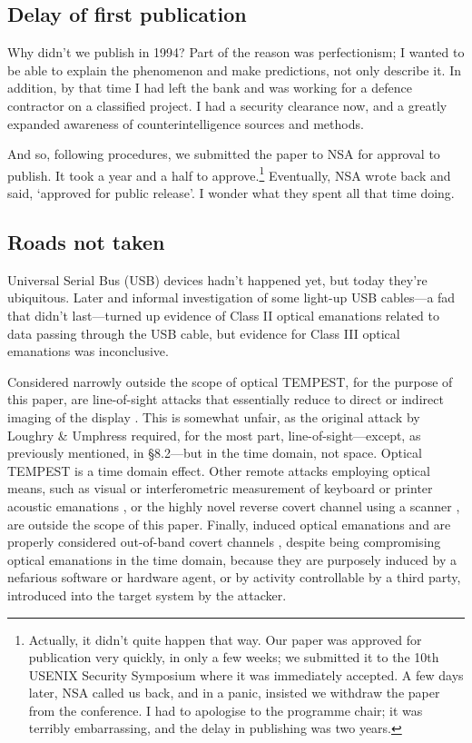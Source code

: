 \documentclass[conference]{IEEEtran}
\begin{document}
\subsection{Delay of first publication}

Why didn't we publish in 1994? Part of the reason was perfectionism; I wanted
to be able to explain the phenomenon and make predictions, not only describe
it. In addition, by that time I had left the bank and was working for a
defence contractor on a classified project. I had a security clearance now,
and a greatly expanded awareness of counterintelligence sources and methods.

And so, following procedures, we submitted the paper to NSA for approval to
publish. It took a year and a half to approve.\footnote{Actually, it didn't
quite happen that way. Our paper was approved for publication very quickly,
in only a few weeks; we submitted it to the 10th USENIX Security Symposium
where it was immediately accepted. A few days later, NSA called us back, and
in a panic, insisted we withdraw the paper from the conference. I had to
apologise to the programme chair; it was terribly embarrassing, and the delay
in publishing was two years.} Eventually, NSA wrote back and said, `approved
for public release'. I wonder what they spent all that time doing.

\subsection{Roads not taken}

Universal Serial Bus (USB) devices hadn't happened yet, but today they're
ubiquitous. Later and informal investigation of some light-up USB cables---a
fad that didn't last---turned up evidence of Class II optical emanations
related to data passing through the USB cable, but evidence for Class III
optical emanations was inconclusive.

Considered narrowly outside the scope of optical TEMPEST, for the purpose of
this paper, are line-of-sight attacks that essentially reduce to direct or
indirect imaging of the display
\cite{Backes2008,Balzarotti2008,Backes2009a,Raguram2011,Xu2013a,Jenkins2013a}.
This is somewhat unfair, as the original attack by Loughry \& Umphress
required, for the most part, line-of-sight---except, as previously mentioned,
in \S 8.2---but in the time domain, not space. Optical TEMPEST is a time
domain effect. Other remote attacks employing optical means, such as visual
or interferometric measurement of keyboard or printer acoustic emanations
\cite{Asonov2004,Zhuang2005,Berger2006,Backes2010}, or the highly novel
reverse covert channel using a scanner \cite{Nassi2017a}, are outside the
scope of this paper. Finally, induced optical emanations
\cite{Sepetnitsky2014a,Guri2016b,Guri2017a,Guri2017b,Lopes2017a,Guri2017c,
Zhou2017,Zhou2018a} and \cite[Appendix A]{Loughry2002a} are properly
considered out-of-band covert channels
\cite{Lampson1973,Hanspach2014,Carrara2016}, despite being compromising
optical emanations in the time domain, because they are purposely induced by
a nefarious software or hardware agent, or by activity controllable by a
third party, introduced into the target system by the attacker.
\end{document}
